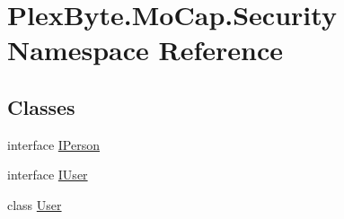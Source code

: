 \hypertarget{namespace_plex_byte_1_1_mo_cap_1_1_security}{}\section{Plex\+Byte.\+Mo\+Cap.\+Security Namespace Reference}
\label{namespace_plex_byte_1_1_mo_cap_1_1_security}
\subsection*{Classes}
\begin{DoxyCompactItemize}
\item 
interface \hyperlink{interface_plex_byte_1_1_mo_cap_1_1_security_1_1_i_person}{I\+Person}
\item 
interface \hyperlink{interface_plex_byte_1_1_mo_cap_1_1_security_1_1_i_user}{I\+User}
\item 
class \hyperlink{class_plex_byte_1_1_mo_cap_1_1_security_1_1_user}{User}
\end{DoxyCompactItemize}
